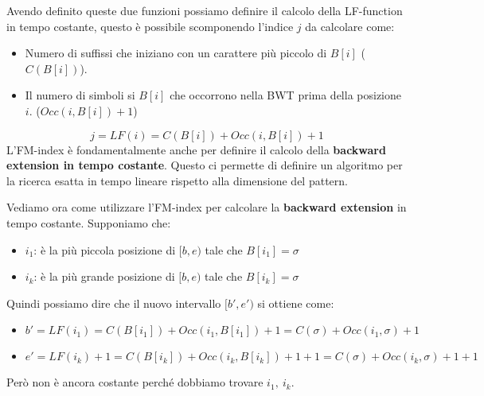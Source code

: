 Avendo definito queste due funzioni possiamo definire il calcolo della LF-function
in tempo costante, questo è possibile scomponendo l'indice $j$ da calcolare come:
\begin{itemize}
    \item Numero di suffissi che iniziano con un carattere più piccolo di $B[i]$
          ($C(B[i])$).
    \item Il numero di simboli si $B[i]$ che occorrono nella BWT prima della
          posizione $i$. ($Occ(i, B[i]) + 1$)
\end{itemize}
\begin{equation}
    j = LF(i) = C(B[i]) + Occ(i, B[i]) + 1
\end{equation}
L'FM-index è fondamentalmente anche per definire il calcolo della \textbf{backward
    extension in tempo costante}. Questo ci permette di definire un algoritmo
per la ricerca esatta in tempo lineare rispetto alla dimensione del pattern.

Vediamo ora come utilizzare l'FM-index per calcolare la \textbf{backward
    extension} in tempo costante. Supponiamo che:
\begin{itemize}
    \item $i_1$: è la più piccola posizione di $[b,e)$ tale che $B[i_1] = \sigma$
    \item $i_k$: è la più grande posizione di $[b,e)$ tale che $B[i_k] = \sigma$
\end{itemize}
Quindi possiamo dire che il nuovo intervallo $[b',e')$ si ottiene come:
\begin{itemize}
    \item $b' = LF(i_1) = C(B[i_1]) + Occ(i_1, B[i_1]) + 1 = C(\sigma) + Occ(i_1,
              \sigma) + 1$
    \item $e' = LF(i_k) + 1 = C(B[i_k]) + Occ(i_k, B[i_k]) + 1 + 1 = C(\sigma) +
              Occ(i_k, \sigma) + 1 + 1$
\end{itemize}
Però non è ancora costante perché dobbiamo trovare $i_1, \ i_k$.

